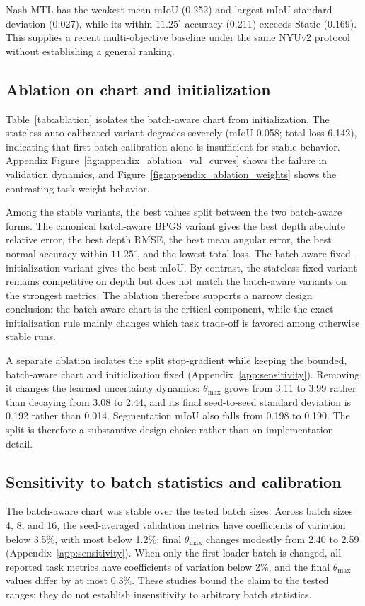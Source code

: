 Nash-MTL has the weakest mean mIoU (0.252) and largest mIoU standard deviation (0.027), while its
within-$11.25^\circ$ accuracy (0.211) exceeds Static (0.169). This supplies a recent
multi-objective baseline under the same NYUv2 protocol without establishing a general ranking.

\subsection{Ablation on chart and initialization}
Table~\ref{tab:ablation} isolates the batch-aware chart from initialization. The stateless
auto-calibrated variant degrades severely (mIoU 0.058; total loss 6.142), indicating that
first-batch calibration alone is insufficient for stable behavior. Appendix
Figure~\ref{fig:appendix_ablation_val_curves} shows the failure in validation dynamics, and
Figure~\ref{fig:appendix_ablation_weights} shows the contrasting task-weight behavior.



Among the stable variants, the best values split between the two batch-aware forms. The canonical batch-aware BPGS variant gives the best depth absolute relative error, the best depth RMSE, the best mean angular error, the best normal accuracy within $11.25^\circ$, and the lowest total loss. The batch-aware fixed-initialization variant gives the best mIoU. By contrast, the stateless fixed variant remains competitive on depth but does not match the batch-aware variants on the strongest metrics. The ablation therefore supports a narrow design conclusion: the batch-aware chart is the critical component, while the exact initialization rule mainly changes which task trade-off is favored among otherwise stable runs.

A separate ablation isolates the split stop-gradient while keeping the bounded, batch-aware chart
and initialization fixed (Appendix~\ref{app:sensitivity}). Removing it changes the learned
uncertainty dynamics: $\theta_{\max}$ grows from 3.11 to 3.99 rather than decaying from 3.08 to
2.44, and its final seed-to-seed standard deviation is 0.192 rather than 0.014. Segmentation
mIoU also falls from 0.198 to 0.190. The split is therefore a substantive design choice rather
than an implementation detail.

\subsection{Sensitivity to batch statistics and calibration}
The batch-aware chart was stable over the tested batch sizes. Across batch sizes 4, 8, and 16,
the seed-averaged validation metrics have coefficients of variation below 3.5\%, with most below
1.2\%; final $\theta_{\max}$ changes modestly from 2.40 to 2.59
(Appendix~\ref{app:sensitivity}). When only the first loader batch is changed, all reported
task metrics have coefficients of variation below 2\%, and the final $\theta_{\max}$ values differ by
at most 0.3\%. These studies bound the claim to the tested ranges; they do not establish
insensitivity to arbitrary batch statistics.

